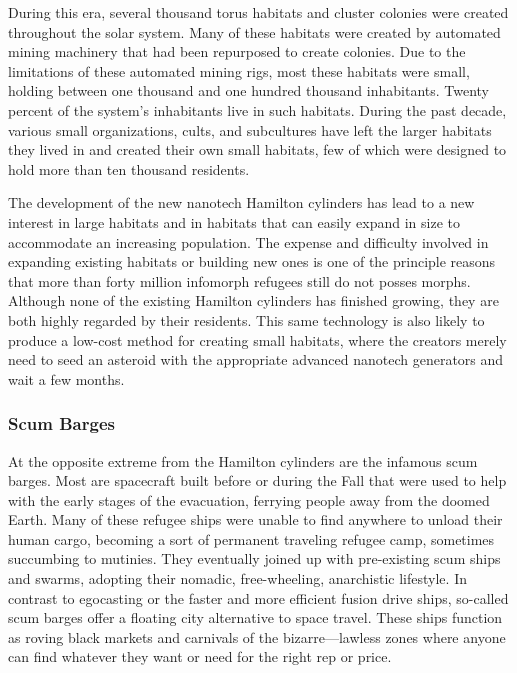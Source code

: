 During this era, several thousand torus habitats 
and cluster colonies were created throughout the solar 
system. Many of these habitats were created by automated mining machinery that had been repurposed 
to create colonies. Due to the limitations of these automated mining rigs, most these habitats were small, 
holding between one thousand and one hundred 
thousand inhabitants. Twenty percent of the system's 
inhabitants live in such habitats. During the past 
decade, various small organizations, cults, and subcultures have left the larger habitats they lived in and 
created their own small habitats, few of which were 
designed to hold more than ten thousand residents.

The development of the new nanotech Hamilton 
cylinders has lead to a new interest in large habitats and in habitats that can easily expand in size 
to accommodate an increasing population. The expense and difficulty involved in expanding existing 
habitats or building new ones is one of the principle 
reasons that more than forty million infomorph 
refugees still do not posses morphs. Although none 
of the existing Hamilton cylinders has finished growing, they are both highly regarded by their residents. 
This same technology is also likely to produce a 
low-cost method for creating small habitats, where 
the creators merely need to seed an asteroid with the 
appropriate advanced nanotech generators and wait 
a few months.

\subsubsection{Scum Barges}

At the opposite extreme from the Hamilton cylinders 
are the infamous scum barges. Most are spacecraft 
built before or during the Fall that were used to 
help with the early stages of the evacuation, ferrying 
people away from the doomed Earth. Many of these 
refugee ships were unable to find anywhere to unload 
their human cargo, becoming a sort of permanent 
traveling refugee camp, sometimes succumbing to 
mutinies. They eventually joined up with pre-existing 
scum ships and swarms, adopting their nomadic, free-wheeling, anarchistic lifestyle. In contrast to egocasting or the faster and more efficient fusion drive ships, 
so-called scum barges offer a floating city alternative 
to space travel. These ships function as roving black 
markets and carnivals of the bizarre—lawless zones 
where anyone can find whatever they want or need for 
the right rep or price.

